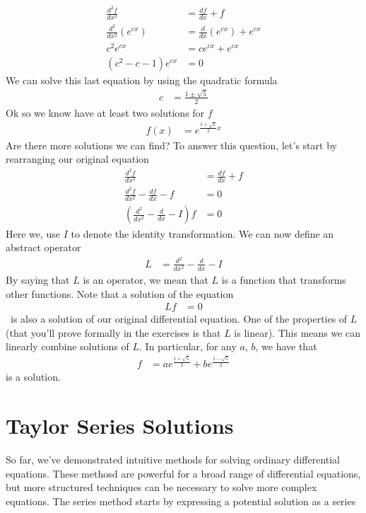 \documentclass[book.tex]{subfiles}
\begin{document}
\begin{align}
    \frac{d^2 f}{dx^2} &= \frac{df}{dx} + f \\
    \frac{d^2}{dx^2} \left (e^{cx} \right ) &= \frac{d}{dx} \left (e^{cx} \right ) + e^{cx} \\
    c^2 e^{cx} &= c e^{cx} + e^{cx} \\
    (c^2 - c - 1)e^{cx} &= 0
\end{align}
We can solve this last equation by using the quadratic formula
\begin{align}
    c &= \frac{1 \pm \sqrt{5}}{2}
\end{align}
Ok so we know have at least two solutions for $f$
\begin{align}
    f(x) &= e^{\frac{1 + \sqrt{5}}{2} x}
\end{align}
Are there more solutions we can find? To answer this question, let's start by rearranging our original equation
\begin{align}
    \frac{d^2 f}{dx^2} &= \frac{df}{dx} + f \\
    \frac{d^2 f}{dx^2} - \frac{df}{dx} - f &= 0 \\
    \left ( \frac{d^2}{dx^2} - \frac{d}{dx} - I\right ) f &= 0 
\end{align}
Here we, use $I$ to denote the identity transformation. We can now define an abstract operator
\begin{align}
    L &= \frac{d^2}{dx^2} - \frac{d}{dx} - I
\end{align}
By saying that $L$ is an operator, we mean that $L$ is a function that transforms other functions. Note that a solution of the equation
\begin{align}
    Lf &= 0
\end{align}
\
\noindent is also a solution of our original differential equation. One of the properties of $L$ (that you'll prove formally in the exercises is that $L$ is linear). This means we can linearly combine solutions of $L$. In particular, for any $a$, $b$, we have that
\begin{align}
    f &= ae^{\frac{1 + \sqrt{5}}{2}} + b e^{\frac{1 - \sqrt{5}}{2}}
\end{align}
is a solution.

\section{Taylor Series Solutions}

So far, we've demonstrated intuitive methods for solving ordinary differential equations. These methosd are powerful for a broad range of differential equations, but more structured techniques can be necessary to solve more complex equations. The series method starts by expressing a potential solution as a series
\end{document}
